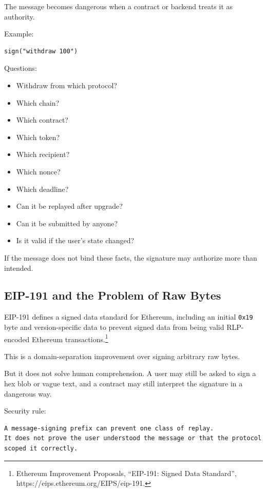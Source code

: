 The message becomes dangerous when a contract or backend treats it as
authority.

Example:

\begin{lstlisting}
sign("withdraw 100")
\end{lstlisting}

Questions:

\begin{itemize}
\tightlist
\item
  Withdraw from which protocol?
\item
  Which chain?
\item
  Which contract?
\item
  Which token?
\item
  Which recipient?
\item
  Which nonce?
\item
  Which deadline?
\item
  Can it be replayed after upgrade?
\item
  Can it be submitted by anyone?
\item
  Is it valid if the user's state changed?
\end{itemize}

If the message does not bind these facts, the signature may authorize
more than intended.

\subsection{EIP-191 and the Problem of Raw Bytes}

EIP-191 defines a signed data standard for Ethereum, including an
initial \passthrough{\lstinline!0x19!} byte and version-specific data to
prevent signed data from being valid RLP-encoded Ethereum
transactions.\footnote{Ethereum Improvement Proposals, ``EIP-191: Signed
  Data Standard'', https://eips.ethereum.org/EIPS/eip-191.}

This is a domain-separation improvement over signing arbitrary raw
bytes.

But it does not solve human comprehension. A user may still be asked to
sign a hex blob or vague text, and a contract may still interpret the
signature in a dangerous way.

Security rule:

\begin{lstlisting}
A message-signing prefix can prevent one class of replay.
It does not prove the user understood the message or that the protocol scoped it correctly.
\end{lstlisting}

